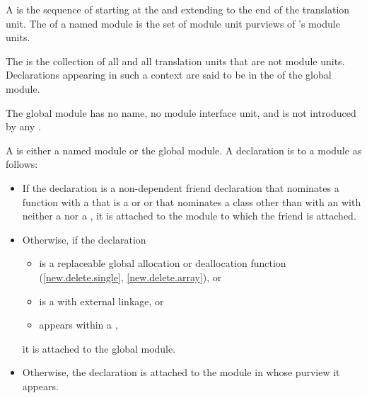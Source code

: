\pnum
A  is
the sequence of 
starting at the 
and extending to the end of the translation unit.
The 
of a named module  is the set of module unit purviews
of 's module units.

\pnum
The  is the collection of all
and all translation units that are not module units.
Declarations appearing in such a context
are said to be in the  of the global module.
\begin{note}
The global module has no name, no module interface unit, and is not
introduced by any .
\end{note}

\pnum
A  is either a named module or the global module.
A declaration is  to a module as follows:
\begin{itemize}
\item
If the declaration is a non-dependent friend declaration
that nominates a function with a 
that is a  or  or
that nominates a class
other than with an  with neither
a  nor a ,
it is attached to the module to which the friend is attached.
\item Otherwise, if the declaration
\begin{itemize}
\item is a replaceable global allocation or deallocation
function (\ref{new.delete.single}, \ref{new.delete.array}), or
\item is a  with external linkage, or
\item appears within a ,
\end{itemize}
it is attached to the global module.

\item Otherwise, the declaration is
attached to the module in whose purview it appears.
\end{itemize}


